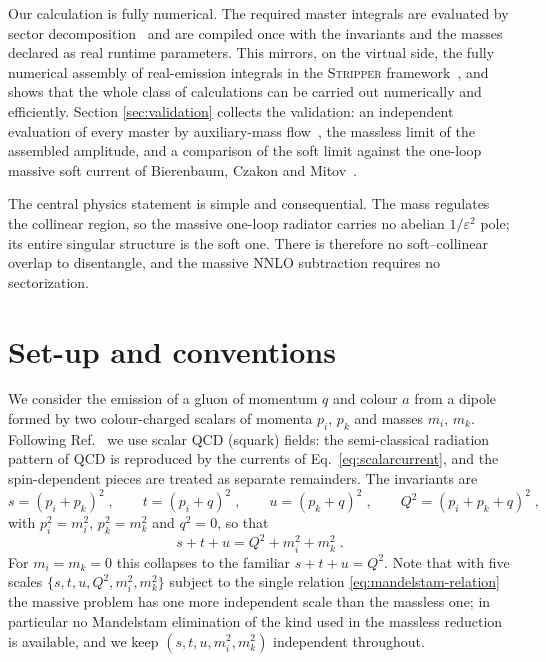 \documentclass[11pt,a4paper]{article}
\newcommand{\eps}{\varepsilon}
\begin{document}
Our calculation is  {fully numerical}. The required master integrals are
evaluated by sector decomposition~\cite{pySecDec} and are compiled once with the
invariants and the masses declared as real runtime parameters. This mirrors, on
the virtual side, the fully numerical assembly of real-emission integrals in
the \textsc{Stripper} framework~\cite{Czakon:stripper}, and shows that the whole
class of calculations can be carried out numerically and efficiently. Section
\ref{sec:validation} collects the validation: an independent evaluation of every
master by auxiliary-mass flow~\cite{AMFlow}, the massless limit of the assembled
amplitude, and a comparison of the soft limit against the one-loop massive soft
current of Bierenbaum, Czakon and Mitov~\cite{BCM}.

The central physics statement is simple and consequential. The mass regulates the
collinear region, so the massive one-loop radiator carries no abelian $1/\eps^2$
pole; its entire singular structure is the soft one. There is therefore no
soft--collinear overlap to disentangle, and the massive NNLO subtraction requires
no sectorization.

\section{Set-up and conventions}
\label{sec:setup}
We consider the emission of a gluon of momentum $q$ and colour $a$ from a dipole
formed by two colour-charged scalars of momenta $p_i$, $p_k$ and masses $m_i$,
$m_k$. Following Ref.~\cite{Campbell:2025} we use scalar QCD (squark) fields:
the semi-classical radiation pattern of QCD is reproduced by the currents of
Eq.~\eqref{eq:scalarcurrent}, and the spin-dependent pieces are treated as
separate remainders. The invariants are
\begin{equation}
  s=(p_i+p_k)^2\;,\qquad t=(p_i+q)^2\;,\qquad u=(p_k+q)^2\;,\qquad
  Q^2=(p_i+p_k+q)^2\;,
  \label{eq:invariants}
\end{equation}
with $p_i^2=m_i^2$, $p_k^2=m_k^2$ and $q^2=0$, so that
\begin{equation}
  s+t+u=Q^2+m_i^2+m_k^2\;.
  \label{eq:mandelstam-relation}
\end{equation}
For $m_i=m_k=0$ this collapses to the familiar $s+t+u=Q^2$. Note that with five
scales $\{s,t,u,Q^2,m_i^2,m_k^2\}$ subject to the single relation
\eqref{eq:mandelstam-relation} the massive problem has one more independent scale
than the massless one; in particular no Mandelstam elimination of the kind used
in the massless reduction is available, and we keep $(s,t,u,m_i^2,m_k^2)$
independent throughout.
\end{document}
